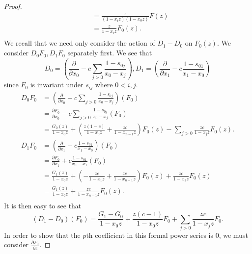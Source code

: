 \documentclass{amsart}
\numberwithin{equation}{section}
\theoremstyle{definition}
\begin{document}
\begin{proof}
\begin{align*}
&=\frac{z}{(1-x_iz)(1-x_0z)}F(z)\\
&=\frac{z}{1-x_iz}F_0(z).\\
\end{align*}
We recall that we need only consider the action of $D_1-D_0$ on $F_0(z)$. We consider $D_0F_0, D_1F_0$ separately first. We see that 
\[
D_0=\left(\frac{\partial}{\partial x_0}-c\sum_{j > 0} \frac{1-s_{0j}}{x_0-x_j}\right), D_1=\left(\frac{\partial}{\partial x_1}-c \frac{1-s_{01}}{x_1-x_0}\right)
\]
since $F_0$ is invariant under $s_{ij}$ where $0 < i,j$. 
\begin{align*}
D_0F_0&=\left(\frac{\partial}{\partial x_0}-c\sum_{j > 0} \frac{1-s_{0j}}{x_0-x_j}\right)(F_0)\\
&=\frac{\partial F_0}{\partial x_0}-c\sum_{j > 0} \frac{1-s_{0j}}{x_0-x_j}(F_0)\\
&=\frac{G_0(z)}{1-x_0z}+\left(\frac{z(1-c)}{1-x_0z}+\frac{zc}{1-x_{n-1}z}\right)F_0(z)-\sum_{j > 0} \frac{zc}{1-x_jz}F_0(z).\\
D_1F_0&=\left(\frac{\partial}{\partial x_1}-c \frac{1-s_{01}}{x_1-x_0}\right)(F_0)\\
&=\frac{\partial F_0}{\partial x_1}+c \frac{1-s_{01}}{x_0-x_1}(F_0)\\
&=\frac{G_1(z)}{1-x_0z}+\left(-\frac{zc}{1-x_1z}+\frac{zc}{1-x_{n-1}z}\right)F_0(z)+\frac{zc}{1-x_1z}F_0(z)\\
&=\frac{G_1(z)}{1-x_0z}+\frac{zc}{1-x_{n-1}z}F_0(z).\\
\end{align*}
It is then easy to see that 
\[
(D_1-D_0)(F_0)=\frac{G_1-G_0}{1-x_0z}+\frac{z(c-1)}{1-x_0z}F_0+\sum_{j>0} \frac{zc}{1-x_jz}F_0.
\]
In order to show that the $p$th coefficient in this formal power series is $0$, we must consider $\frac{\partial F_0}{\partial z}$. 


\end{proof}
\end{document}
